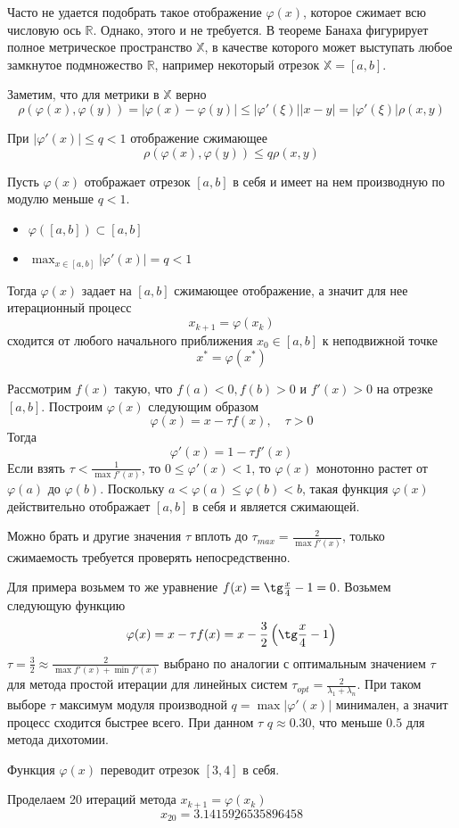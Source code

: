 \documentclass[professionalfonts,compress,unicode]{beamer}
\begin{document}
{
	Часто не удается подобрать такое отображение $\varphi(x)$, которое сжимает всю числовую ось $\mathbb{R}$. 
	Однако, этого и не требуется.
	В теореме Банаха фигурирует полное метрическое пространство $\mathbb{X}$, в качестве которого может выступать любое замкнутое 
	подмножество $\mathbb{R}$, например некоторый отрезок $\mathbb{X} = [a,b]$. 
	
	Заметим, что для метрики в $\mathbb{X}$ верно
	$$
	\rho(\varphi(x),\varphi(y)) = |\varphi(x)-\varphi(y)| \leq |\varphi'(\xi)| |x-y|  = |\varphi'(\xi)| \rho(x,y)
	$$
	
	При $|\varphi'(x)| \leq q < 1$ отображение сжимающее
	$$
	\rho(\varphi(x),\varphi(y)) \leq q \rho(x,y)
	$$	
}

{
	Пусть $\varphi(x)$ отображает отрезок $[a,b]$ в себя и имеет на нем производную по модулю меньше $q < 1$.
	\begin{itemize}
		\item $\varphi([a,b]) \subset [a,b]$
		\item $\displaystyle \max_{x \in [a,b]}|\varphi'(x)| = q < 1$
	\end{itemize}
	Тогда $\varphi(x)$ задает на $[a,b]$ сжимающее отображение, а значит для нее итерационный процесс
	$$
	x_{k+1} = \varphi(x_k)
	$$
	сходится от любого начального приближения $x_0 \in [a,b]$ к неподвижной точке
	$$
	x^* = \varphi(x^*)
	$$
}

{
	Рассмотрим $f(x)$ такую, что $f(a) < 0, f(b) > 0$ и $f'(x) > 0$ на отрезке $[a,b]$.
	Построим $\varphi(x)$ следующим образом
	$$
	\varphi(x) = x - \tau f(x),\quad \tau > 0
	$$
	Тогда 
	$$
	\varphi'(x) = 1 - \tau f'(x)
	$$
	Если взять $\tau < \frac{1}{\max f'(x)}$, то $0 \leq \varphi'(x) < 1$, то $\varphi(x)$ монотонно растет 
	от $\varphi(a)$ до $\varphi(b)$. Поскольку $a < \varphi(a) \leq \varphi(b) < b$, такая функция $\varphi(x)$
	действительно отображает $[a,b]$ в себя и является сжимающей.
	
	Можно брать и другие значения $\tau$ вплоть до $\tau_{max} = \frac{2}{\max f'(x)}$, только сжимаемость требуется проверять
	непосредственно.
}

{
	Для примера возьмем то же уравнение $f(x) = \tg \frac{x}{4} - 1 = 0$. Возьмем следующую функцию
	$$
	\varphi(x) = x - \tau f(x) = x - \frac{3}{2}\left(\tg\frac{x}{4}-1\right)
	$$
	$\tau = \frac{3}{2} \approx \frac{2}{\max f'(x) + \min f'(x)}$ выбрано по аналогии с оптимальным
	значением $\tau$ для метода простой итерации для линейных систем $\tau_{opt} = \frac{2}{\lambda_1 + \lambda_n}$.
	При таком выборе $\tau$ максимум модуля производной $q = \max |\varphi'(x)|$ минимален, а значит процесс сходится быстрее всего.
	При данном $\tau$ $q \approx 0.30$, что меньше $0.5$ для метода дихотомии.
	
	Функция $\varphi(x)$ переводит отрезок $[3,4]$ в себя. 
	
	Проделаем 20 итераций метода $x_{k+1} = \varphi(x_k)$
	$$x_{20} = \underline{3.141592653589}6458$$
}
\end{document}
